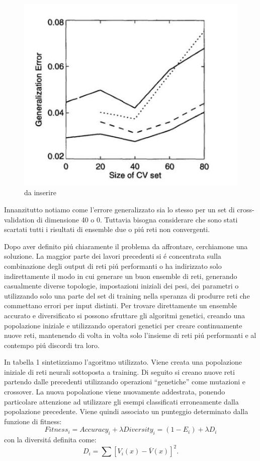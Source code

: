 \documentclass[a4paper,10pt]{article}
\begin{document}
  \begin{figure}[h!]
   \centering
   \includegraphics[scale=0.4]{GenError.png} 
   \caption{da inserire}
   \label{GenErrorpng}
  \end{figure}
  Innanzitutto notiamo come l'errore generalizzato sia lo stesso per un set di cross-validation di dimensione 40 o 0. Tuttavia bisogna considerare che sono stati scartati tutti i risultati di ensemble due o pi\'u reti non convergenti.

  Dopo aver definito pi\'u chiaramente il problema da affrontare, cerchiamone una soluzione. La maggior parte dei lavori precedenti si \'e concentrata sulla combinazione degli output di reti pi\'u performanti o ha indirizzato solo indirettamente il modo in cui generare un buon ensemble di reti, generando casualmente diverse topologie, impostazioni iniziali dei pesi, dei parametri o utilizzando solo una parte del set di training nella speranza di produrre reti che commettano errori per input distinti. Per trovare direttamente un ensemble accurato e diversificato si possono sfruttare gli algoritmi genetici, creando una popolazione iniziale e utilizzando operatori genetici per creare continuamente nuove reti, mantenendo di volta in volta solo l'insieme di reti pi\'u performanti e al contempo pi\'u discordi tra loro. 

  
  In tabella 1 sintetizziamo l'agoritmo utilizzato. Viene creata una popolazione iniziale di reti neurali sottoposta a training. Di seguito si creano nuove reti partendo dalle precedenti utilizzando operazioni ``genetiche'' come mutazioni e crossover. La nuova popolazione viene nuovamente addestrata, ponendo particolare attenzione ad utilizzare gli esempi classificati erroneamente dalla popolazione precedente. Viene quindi associato un punteggio determinato dalla funzione di fitness:
  \begin{equation}
   Fitness_i = Accuracy_i + \lambda Diversity_i = (1-E_i) + \lambda D_i \label{fitness}
  \end{equation}
  con la diversit\'a definita come:
  \begin{equation}
   D_i = \sum \left[ V_i \left(x\right) - \overline{V} \left(x\right) \right]^2. \label{diversity}
  \end{equation}
  
\end{document}
